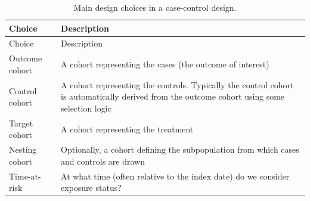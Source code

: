 \documentclass[]{book}
\begin{document}
\begin{longtable}[]{@{}ll@{}}
\caption{\label{tab:ccChoices} Main design choices in a case-control design.}\tabularnewline
\toprule
\begin{minipage}[b]{0.22\columnwidth}\raggedright
Choice\strut
\end{minipage} & \begin{minipage}[b]{0.72\columnwidth}\raggedright
Description\strut
\end{minipage}\tabularnewline
\midrule
\endfirsthead
\toprule
\begin{minipage}[b]{0.22\columnwidth}\raggedright
Choice\strut
\end{minipage} & \begin{minipage}[b]{0.72\columnwidth}\raggedright
Description\strut
\end{minipage}\tabularnewline
\midrule
\endhead
\begin{minipage}[t]{0.22\columnwidth}\raggedright
Outcome cohort\strut
\end{minipage} & \begin{minipage}[t]{0.72\columnwidth}\raggedright
A cohort representing the cases (the outcome of interest)\strut
\end{minipage}\tabularnewline
\begin{minipage}[t]{0.22\columnwidth}\raggedright
Control cohort\strut
\end{minipage} & \begin{minipage}[t]{0.72\columnwidth}\raggedright
A cohort representing the controls. Typically the control cohort is automatically derived from the outcome cohort using some selection logic\strut
\end{minipage}\tabularnewline
\begin{minipage}[t]{0.22\columnwidth}\raggedright
Target cohort\strut
\end{minipage} & \begin{minipage}[t]{0.72\columnwidth}\raggedright
A cohort representing the treatment\strut
\end{minipage}\tabularnewline
\begin{minipage}[t]{0.22\columnwidth}\raggedright
Nesting cohort\strut
\end{minipage} & \begin{minipage}[t]{0.72\columnwidth}\raggedright
Optionally, a cohort defining the subpopulation from which cases and controls are drawn\strut
\end{minipage}\tabularnewline
\begin{minipage}[t]{0.22\columnwidth}\raggedright
Time-at-risk\strut
\end{minipage} & \begin{minipage}[t]{0.72\columnwidth}\raggedright
At what time (often relative to the index date) do we consider exposure status?\strut
\end{minipage}\tabularnewline
\bottomrule
\end{longtable}
\end{document}
